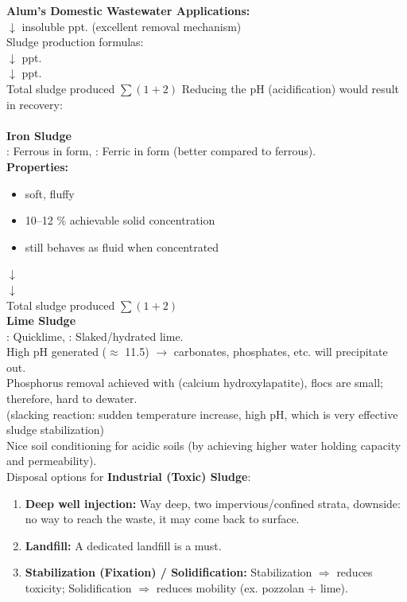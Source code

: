 \documentclass{article}
\numberwithin{equation}{section}
\begin{document}
\textbf{Alum's Domestic Wastewater Applications:}\\
 $\downarrow$ insoluble ppt. (excellent removal mechanism)\\
Sludge production formulas:\\
 $\downarrow$ ppt.\\
 $\downarrow$ ppt.\\
Total sludge produced $\sum (1 + 2)$
Reducing the pH (acidification) would result in  recovery:\\
\\
\textbf{Iron Sludge}\\
: Ferrous in  form, : Ferric in  form (better compared to ferrous).\\
\textbf{Properties:}
\begin{itemize}
    \item soft, fluffy
    \item 10--12 \% achievable solid concentration
    \item still behaves as fluid when concentrated
\end{itemize}
 $\downarrow$\\
 $\downarrow$\\
Total sludge produced $\sum (1 + 2)$\\
\textbf{Lime Sludge}\\
: Quicklime, : Slaked/hydrated lime.\\
High pH generated ($\approx$ 11.5) $\rightarrow$ carbonates, phosphates, etc. will precipitate out.\\
Phosphorus removal achieved with  (calcium hydroxylapatite), flocs are small; therefore, hard to dewater.\\
 (slacking reaction: sudden temperature increase, high pH, which is very effective sludge stabilization)\\
Nice soil conditioning for acidic soils (by achieving higher water holding capacity and permeability).\\
Disposal options for \textbf{Industrial (Toxic) Sludge}:
\begin{enumerate}
    \item \textbf{Deep well injection:} Way deep, two impervious/confined strata, downside: no way to reach the waste, it may come back to surface.
     \item \textbf{Landfill:} A dedicated landfill is a must.
     \item \textbf{Stabilization (Fixation) / Solidification:} Stabilization $\Rightarrow$ reduces toxicity; Solidification $\Rightarrow$ reduces mobility (ex. pozzolan + lime).
\end{enumerate}
\end{document}
